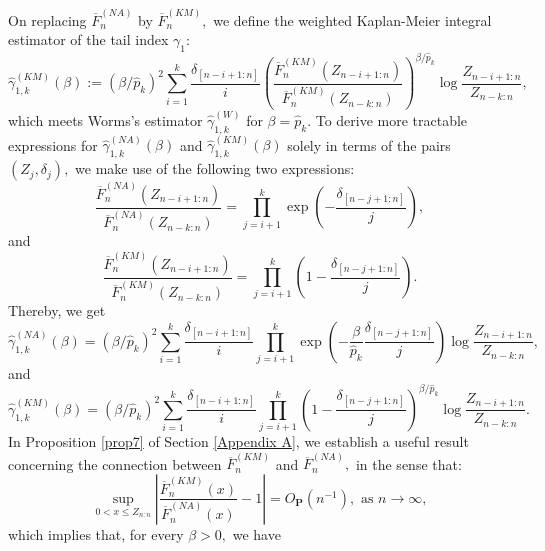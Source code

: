 \documentclass[reqno,openbib,runningheads,a4paper,12pt]{amsart}%
\begin{document}
\noindent On replacing $\overline{F}_{n}^{\left(  NA\right)  }$ by
$\overline{F}_{n}^{\left(  KM\right)  },$ we define the weighted Kaplan-Meier
integral estimator of the tail index $\gamma_{1}:$%
\[
\widehat{\gamma}_{1,k}^{\left(  KM\right)  }\left(  \beta\right)  :=\left(
\beta/\widehat{p}_{k}\right)  ^{2}\sum_{i=1}^{k}\frac{\delta_{\left[
n-i+1:n\right]  }}{i}\left(  \frac{\overline{F}_{n}^{\left(  KM\right)
}\left(  Z_{n-i+1:n}\right)  }{\overline{F}_{n}^{\left(  KM\right)  }\left(
Z_{n-k:n}\right)  }\right)  ^{\beta/\widehat{p}_{k}}\log\frac{Z_{n-i+1:n}%
}{Z_{n-k:n}},
\]
which meets Worms's estimator $\widehat{\gamma}_{1,k}^{\left(  W\right)  }$
for $\beta=\widehat{p}_{k}.$ To derive more tractable expressions for
$\widehat{\gamma}_{1,k}^{\left(  NA\right)  }\left(  \beta\right)  $ and
$\widehat{\gamma}_{1,k}^{\left(  KM\right)  }\left(  \beta\right)  $ solely in
terms of the pairs $\left(  Z_{j},\delta_{j}\right)  ,$ we make use of the
following two expressions:%
\[
\frac{\overline{F}_{n}^{\left(  NA\right)  }\left(  Z_{n-i+1:n}\right)
}{\overline{F}_{n}^{\left(  NA\right)  }\left(  Z_{n-k:n}\right)  }%
=\prod_{j=i+1}^{k}\exp\left(  -\frac{\delta_{\left[  n-j+1:n\right]  }}%
{j}\right)  ,
\]
and%
\[
\frac{\overline{F}_{n}^{\left(  KM\right)  }\left(  Z_{n-i+1:n}\right)
}{\overline{F}_{n}^{\left(  KM\right)  }\left(  Z_{n-k:n}\right)  }%
=\prod_{j=i+1}^{k}\left(  1-\frac{\delta_{\left[  n-j+1:n\right]  }}%
{j}\right)  .
\]
Thereby, we get%
\[
\widehat{\gamma}_{1,k}^{\left(  NA\right)  }\left(  \beta\right)  =\left(
\beta/\widehat{p}_{k}\right)  ^{2}\sum_{i=1}^{k}\frac{\delta_{\left[
n-i+1:n\right]  }}{i}\prod_{j=i+1}^{k}\exp\left(  -\frac{\beta}{\widehat{p}%
_{k}}\frac{\delta_{\left[  n-j+1:n\right]  }}{j}\right)  \log\frac
{Z_{n-i+1:n}}{Z_{n-k:n}},
\]
and%
\[
\widehat{\gamma}_{1,k}^{\left(  KM\right)  }\left(  \beta\right)  =\left(
\beta/\widehat{p}_{k}\right)  ^{2}\sum_{i=1}^{k}\frac{\delta_{\left[
n-i+1:n\right]  }}{i}\prod_{j=i+1}^{k}\left(  1-\frac{\delta_{\left[
n-j+1:n\right]  }}{j}\right)  ^{\beta/\widehat{p}_{k}}\log\frac{Z_{n-i+1:n}%
}{Z_{n-k:n}}.
\]
In Proposition \ref{prop7} of Section \ref{Appendix A}, we establish a useful
result concerning the connection between $\overline{F}_{n}^{\left(  KM\right)
}$ and $\overline{F}_{n}^{\left(  NA\right)  },$ in the sense that:%
\[
\sup_{0<x\leq Z_{n:n}}\left\vert \frac{\overline{F}_{n}^{\left(  KM\right)
}\left(  x\right)  }{\overline{F}_{n}^{\left(  NA\right)  }\left(  x\right)
}-1\right\vert =O_{\mathbf{P}}\left(  n^{-1}\right)  ,\text{ as }%
n\rightarrow\infty,
\]
which implies that, for every $\beta>0,$ we have%
\end{document}
